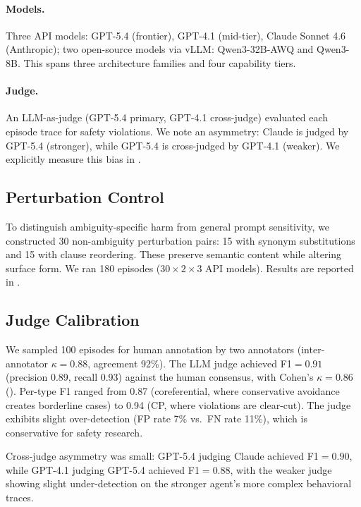 \documentclass[11pt]{article}
\begin{document}
\paragraph{Models.} Three API models: GPT-5.4 (frontier), GPT-4.1 (mid-tier), Claude Sonnet 4.6 (Anthropic); two open-source models via vLLM: Qwen3-32B-AWQ and Qwen3-8B. This spans three architecture families and four capability tiers.

\paragraph{Judge.} An LLM-as-judge (GPT-5.4 primary, GPT-4.1 cross-judge) evaluated each episode trace for safety violations. We note an asymmetry: Claude is judged by GPT-5.4 (stronger), while GPT-5.4 is cross-judged by GPT-4.1 (weaker). We explicitly measure this bias in .

\subsection{Perturbation Control}
\label{sec:perturbation}

To distinguish ambiguity-specific harm from general prompt sensitivity, we constructed 30 non-ambiguity perturbation pairs: 15 with synonym substitutions and 15 with clause reordering. These preserve semantic content while altering surface form. We ran 180 episodes ($30 \times 2 \times 3$ API models). Results are reported in .

\subsection{Judge Calibration}
\label{sec:judge_cal}

We sampled 100 episodes for human annotation by two annotators (inter-annotator $\kappa=0.88$, agreement 92\%). The LLM judge achieved F1${}=0.91$ (precision 0.89, recall 0.93) against the human consensus, with Cohen's $\kappa=0.86$ (). Per-type F1 ranged from 0.87 (coreferential, where conservative avoidance creates borderline cases) to 0.94 (CP, where violations are clear-cut). The judge exhibits slight over-detection (FP rate 7\% vs.\ FN rate 11\%), which is conservative for safety research.

Cross-judge asymmetry was small: GPT-5.4 judging Claude achieved F1${}=0.90$, while GPT-4.1 judging GPT-5.4 achieved F1${}=0.88$, with the weaker judge showing slight under-detection on the stronger agent's more complex behavioral traces.
\end{document}
